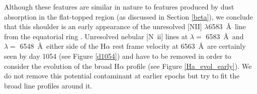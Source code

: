 \documentclass[useAMS,usenatbib,usegraphicx]{mnras}
\begin{document}
Although these features are similar in nature to features produced by dust absorption in the flat-topped region (as discussed in Section \ref{beta}), we conclude that this shoulder
is an early appearance of the unresolved [NII] $\lambda$6583~\AA\ line from the equatorial ring \citep{Kozma1997}. 
Unresolved nebular [N~{\sc ii}] lines at $\lambda=$ 
6583~\AA\ and $\lambda=$ 6548~\AA\ either side of the H$\alpha$ rest frame
 velocity at 6563~\AA\ are certainly seen by day 1054 (see Figure \ref{d1054}) and have to be 
removed in order to consider the evolution of the broad H$\alpha$ profile (see Figure \ref{Ha_evol_early}). 
We do not remove this potential contaminant at earlier epochs but try to fit the broad line profiles around it.
 
\end{document}
